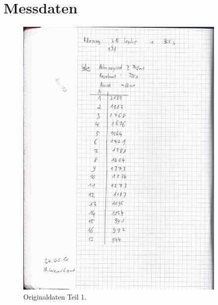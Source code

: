 \section{Messdaten}
% 
% 
%

\begin{figure}[H]
  \centering
  \includegraphics[page=1, height=14cm]{messdaten/scan.pdf}
  \caption{Originaldaten Teil 1.}
  \label{fig:original1}
\end{figure}

